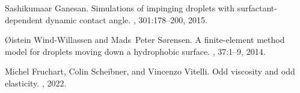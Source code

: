 \documentclass[%
 amsmath,amssymb,
 aps,
10.5pt]{revtex4-2}
\begin{document}
\begin{thebibliography}{10}
Sashikumaar Ganesan.
\newblock Simulations of impinging droplets with surfactant-dependent dynamic
  contact angle.
, 301:178--200, 2015.

{\O}istein Wind-Willassen and Mads~Peter S{\o}rensen.
\newblock A finite-element method model for droplets moving down a hydrophobic
  surface.
, 37:1--9, 2014.

Michel Fruchart, Colin Scheibner, and Vincenzo Vitelli.
\newblock Odd viscosity and odd elasticity.
, 2022.

\end{thebibliography}
\end{document}
